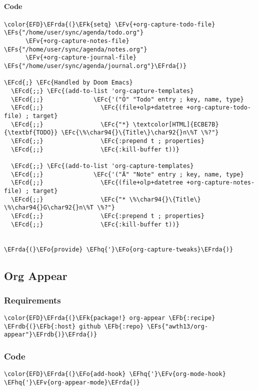 \documentclass[a4wide,10pt]{article}
\newcommand{\EFc}[1]{\textcolor{EFc}{#1}} %
\newcommand{\EFcd}[1]{\textcolor{EFcd}{#1}} %
\newcommand{\EFs}[1]{\textcolor{EFs}{#1}} %
\newcommand{\EFk}[1]{\textcolor{EFk}{#1}} %
\newcommand{\EFb}[1]{\textcolor{EFb}{#1}} %
\newcommand{\EFv}[1]{\textcolor{EFv}{#1}} %
\newcommand{\EFo}[1]{\textcolor{EFo}{#1}} %
\newcommand{\EFhq}[1]{\textcolor{EFhq}{#1}} %
\newcommand{\EFrda}[1]{\textcolor{EFrda}{#1}} %
\newcommand{\EFrdb}[1]{\textcolor{EFrdb}{#1}} %
\begin{document}
\paragraph{Code}
\label{sec:org0ec7f24}
\begin{Code}
\begin{Verbatim}
\color{EFD}\EFrda{(}\EFk{setq} \EFv{+org-capture-todo-file} \EFs{"/home/user/sync/agenda/todo.org"}
      \EFv{+org-capture-notes-file} \EFs{"/home/user/sync/agenda/notes.org"}
      \EFv{+org-capture-journal-file} \EFs{"/home/user/sync/agenda/journal.org"}\EFrda{)}

\EFcd{;} \EFc{Handled by Doom Emacs}
  \EFcd{;;} \EFc{(add-to-list 'org-capture-templates}
  \EFcd{;;}              \EFc{'("Ö" "Todo" entry ; key, name, type}
  \EFcd{;;}                \EFc{(file+olp+datetree +org-capture-todo-file) ; target}
  \EFcd{;;}                \EFc{"*} \textcolor[HTML]{ECBE7B}{\textbf{TODO}} \EFc{\%\char94{}\{Title\}\char92{}n\%T \%?"}
  \EFcd{;;}                \EFc{:prepend t ; properties}
  \EFcd{;;}                \EFc{:kill-buffer t))}

  \EFcd{;;} \EFc{(add-to-list 'org-capture-templates}
  \EFcd{;;}              \EFc{'("Ä" "Note" entry ; key, name, type}
  \EFcd{;;}                \EFc{(file+olp+datetree +org-capture-notes-file) ; target}
  \EFcd{;;}                \EFc{"* \%\char94{}\{Title\} \%\char94{}G\char92{}n\%T \%?"}
  \EFcd{;;}                \EFc{:prepend t ; properties}
  \EFcd{;;}                \EFc{:kill-buffer t))}


\EFrda{(}\EFo{provide} \EFhq{'}\EFo{org-capture-tweaks}\EFrda{)}
\end{Verbatim}
\end{Code}
\subsection{Org Appear}
\label{sec:org9b43618}
\subsubsection{Requirements}
\label{sec:org99fac0f}
\begin{Code}
\begin{Verbatim}
\color{EFD}\EFrda{(}\EFk{package!} org-appear \EFb{:recipe} \EFrdb{(}\EFb{:host} github \EFb{:repo} \EFs{"awth13/org-appear"}\EFrdb{)}\EFrda{)}
\end{Verbatim}
\end{Code}
\subsubsection{Code}
\label{sec:org573df5c}
\begin{Code}
\begin{Verbatim}
\color{EFD}\EFrda{(}\EFo{add-hook} \EFhq{'}\EFv{org-mode-hook} \EFhq{'}\EFv{org-appear-mode}\EFrda{)}
\end{Verbatim}
\end{Code}
\end{document}
